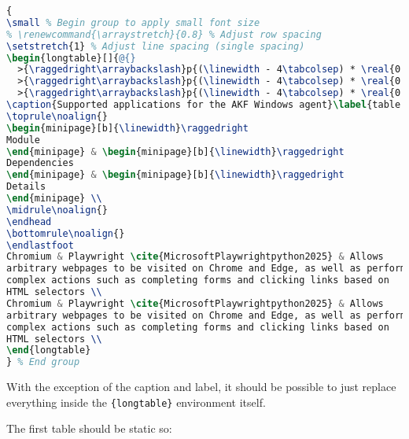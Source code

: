 \begin{lstlisting}[language=TeX]
{
\small % Begin group to apply small font size
% \renewcommand{\arraystretch}{0.8} % Adjust row spacing
\setstretch{1} % Adjust line spacing (single spacing)
\begin{longtable}[]{@{}
  >{\raggedright\arraybackslash}p{(\linewidth - 4\tabcolsep) * \real{0.20}}
  >{\raggedright\arraybackslash}p{(\linewidth - 4\tabcolsep) * \real{0.20}}
  >{\raggedright\arraybackslash}p{(\linewidth - 4\tabcolsep) * \real{0.60}}@{}}
\caption{Supported applications for the AKF Windows agent}\label{table:akf-applications} \\
\toprule\noalign{}
\begin{minipage}[b]{\linewidth}\raggedright
Module
\end{minipage} & \begin{minipage}[b]{\linewidth}\raggedright
Dependencies
\end{minipage} & \begin{minipage}[b]{\linewidth}\raggedright
Details
\end{minipage} \\
\midrule\noalign{}
\endhead
\bottomrule\noalign{}
\endlastfoot
Chromium & Playwright \cite{MicrosoftPlaywrightpython2025} & Allows
arbitrary webpages to be visited on Chrome and Edge, as well as perform
complex actions such as completing forms and clicking links based on
HTML selectors \\
Chromium & Playwright \cite{MicrosoftPlaywrightpython2025} & Allows
arbitrary webpages to be visited on Chrome and Edge, as well as perform
complex actions such as completing forms and clicking links based on
HTML selectors \\
\end{longtable}
} % End group
\end{lstlisting}

With the exception of the caption and label, it should be possible to
just replace everything inside the
\passthrough{\lstinline!\{longtable\}!} environment itself.

The first table should be static so:

